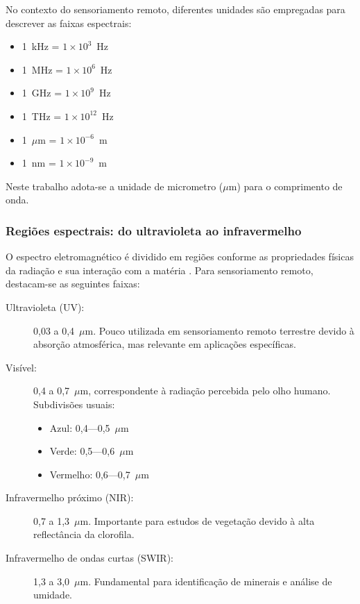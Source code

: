 No contexto do sensoriamento remoto, diferentes unidades são empregadas para
descrever as faixas espectrais:
\begin{itemize}
    \item 1~kHz = $1 \times 10^{3}$~Hz
    \item 1~MHz = $1 \times 10^{6}$~Hz
    \item 1~GHz = $1 \times 10^{9}$~Hz
    \item 1~THz = $1 \times 10^{12}$~Hz
    \item 1~$\mu$m = $1 \times 10^{-6}$~m
    \item 1~nm = $1 \times 10^{-9}$~m
\end{itemize}

Neste trabalho adota-se a unidade de micrometro ($\mu$m) para o
comprimento de onda.

\subsubsection{Regiões espectrais: do ultravioleta ao infravermelho}

O espectro eletromagnético é dividido em regiões conforme as
propriedades físicas da radiação e sua interação com a matéria
\cite{Lorenzzetti2015, Baptista2019}. Para sensoriamento remoto,
destacam-se as seguintes faixas:

\begin{description}
    \item[Ultravioleta (UV):] 0,03 a 0,4~$\mu$m. Pouco utilizada
    em sensoriamento remoto terrestre devido à absorção atmosférica,
    mas relevante em aplicações específicas.
    \item[Visível:] 0,4 a 0,7~$\mu$m, correspondente à radiação
    percebida pelo olho humano. Subdivisões usuais:
\begin{itemize}
        \item Azul: 0,4---0,5~$\mu$m
        \item Verde: 0,5---0,6~$\mu$m
        \item Vermelho: 0,6---0,7~$\mu$m
\end{itemize}
    \item[Infravermelho próximo (NIR):] 0,7 a 1,3~$\mu$m. Importante
    para estudos de vegetação devido à alta reflectância da clorofila.
    \item[Infravermelho de ondas curtas (SWIR):] 1,3 a 3,0~$\mu$m.
    Fundamental para identificação de minerais e análise de umidade.
\end{description}

